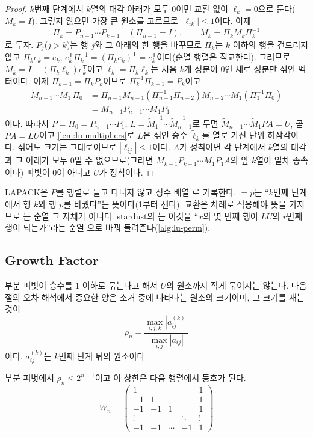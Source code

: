 \begin{proof}
$k$번째 단계에서 $k$열의 대각 아래가 모두 $0$이면 교환 없이 $\ell_k=0$으로 둔다($M_k=I$). 그렇지 않으면 가장 큰 원소를 고르므로 $|\ell_{ik}|\le1$이다. 이제
\[
\Pi_k=P_{n-1}\cdots P_{k+1}\quad(\Pi_{n-1}=I),\qquad\tilde M_k=\Pi_kM_k\Pi_k^{-1}
\]
로 두자. $P_j$($j>k$)는 행 $j$와 그 아래의 한 행을 바꾸므로 $\Pi_k$는 $k$ 이하의 행을 건드리지 않고 $\Pi_ke_k=e_k$, $e_k^{\mathsf T}\Pi_k^{-1}=(\Pi_ke_k)^{\mathsf T}=e_k^{\mathsf T}$이다(순열 행렬은 직교한다). 그러므로 $\tilde M_k=I-(\Pi_k\ell_k)e_k^{\mathsf T}$이고 $\tilde\ell_k=\Pi_k\ell_k$는 처음 $k$개 성분이 $0$인 채로 성분만 섞인 벡터이다. 이제 $\Pi_{k-1}=\Pi_kP_k$이므로 $\Pi_k^{-1}\Pi_{k-1}=P_k$이고
\begin{align*}
\tilde M_{n-1}\cdots\tilde M_1\,\Pi_0
&=\Pi_{n-1}M_{n-1}(\Pi_{n-1}^{-1}\Pi_{n-2})M_{n-2}\cdots M_1(\Pi_1^{-1}\Pi_0)\\
&=M_{n-1}P_{n-1}\cdots M_1P_1
\end{align*}
이다. 따라서 $P=\Pi_0=P_{n-1}\cdots P_1$, $L=\tilde M_1^{-1}\cdots\tilde M_{n-1}^{-1}$로 두면 $\tilde M_{n-1}\cdots\tilde M_1PA=U$, 곧 $PA=LU$이고 \cref{lem:lu-multipliers}로 $L$은 섞인 승수 $\tilde\ell_k$를 열로 가진 단위 하삼각이다. 섞어도 크기는 그대로이므로 $|\ell_{ij}|\le1$이다. $A$가 정칙이면 각 단계에서 $k$열의 대각과 그 아래가 모두 $0$일 수 없으므로(그러면 $M_{k-1}P_{k-1}\cdots M_1P_1A$의 앞 $k$열이 일차 종속이다) 피벗이 $0$이 아니고 $U$가 정칙이다.
\end{proof}

LAPACK은 $P$를 행렬로 들고 다니지 않고 정수 배열 로 기록한다.  $=p$는 ``$k$번째 단계에서 행 $k$와 행 $p$를 바꿨다''는 뜻이다(1부터 센다). 교환은 차례로 적용해야 뜻을 가지므로 는 순열 그 자체가 아니다. stardust의 는 이것을 ``$x$의 몇 번째 행이 $LU$의 $r$번째 행이 되는가''라는 순열 으로 바꿔 돌려준다(\cref{alg:lu-perm}).

\subsection{Growth Factor}

부분 피벗이 승수를 $1$ 이하로 묶는다고 해서 $U$의 원소까지 작게 묶이지는 않는다. 다음 절의 오차 해석에서 중요한 양은 소거 중에 나타나는 원소의 크기이며, 그 크기를 재는 것이 
\[
\rho_n=\frac{\max_{i,j,k}|a^{(k)}_{ij}|}{\max_{i,j}|a_{ij}|}
\]
이다. $a^{(k)}_{ij}$는 $k$번째 단계 뒤의 원소이다.

\begin{proposition}
\label{prop:lu-growth-bound}
부분 피벗에서 $\rho_n\le2^{n-1}$이고 이 상한은 다음 행렬에서 등호가 된다.
\[
W_n=\begin{pmatrix}
1&&&&1\\
-1&1&&&1\\
-1&-1&1&&1\\
\vdots&&&\ddots&\vdots\\
-1&-1&\cdots&-1&1
\end{pmatrix}
\]
\end{proposition}

